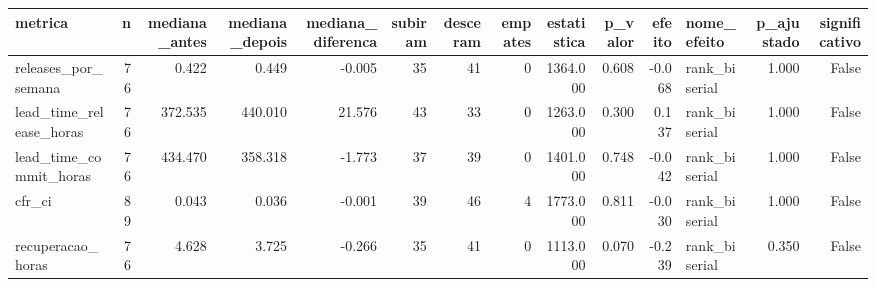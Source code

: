 \begin{tabular}{lrrrrrrrrrrlrr}
\toprule
metrica & n & mediana_antes & mediana_depois & mediana_diferenca & subiram & desceram & empates & estatistica & p_valor & efeito & nome_efeito & p_ajustado & significativo \\
\midrule
releases_por_semana & 76 & 0.422 & 0.449 & -0.005 & 35 & 41 & 0 & 1364.000 & 0.608 & -0.068 & rank_biserial & 1.000 & False \\
lead_time_release_horas & 76 & 372.535 & 440.010 & 21.576 & 43 & 33 & 0 & 1263.000 & 0.300 & 0.137 & rank_biserial & 1.000 & False \\
lead_time_commit_horas & 76 & 434.470 & 358.318 & -1.773 & 37 & 39 & 0 & 1401.000 & 0.748 & -0.042 & rank_biserial & 1.000 & False \\
cfr_ci & 89 & 0.043 & 0.036 & -0.001 & 39 & 46 & 4 & 1773.000 & 0.811 & -0.030 & rank_biserial & 1.000 & False \\
recuperacao_horas & 76 & 4.628 & 3.725 & -0.266 & 35 & 41 & 0 & 1113.000 & 0.070 & -0.239 & rank_biserial & 0.350 & False \\
\bottomrule
\end{tabular}
